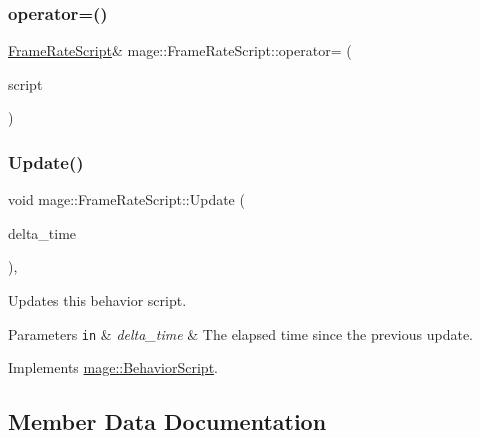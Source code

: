 \subsubsection{\texorpdfstring{operator=()}{operator=()}\hspace{0.1cm}{\footnotesize\ttfamily [2/2]}}
{\footnotesize\ttfamily \hyperlink{classmage_1_1_frame_rate_script}{Frame\+Rate\+Script}\& mage\+::\+Frame\+Rate\+Script\+::operator= (\begin{DoxyParamCaption}\item[{\hyperlink{classmage_1_1_frame_rate_script}{Frame\+Rate\+Script} \&\&}]{script }\end{DoxyParamCaption})\hspace{0.3cm}{\ttfamily [delete]}}

\hypertarget{classmage_1_1_frame_rate_script_a9bab0b26279823f1387428268b30e034}{}\label{classmage_1_1_frame_rate_script_a9bab0b26279823f1387428268b30e034} 
\subsubsection{\texorpdfstring{Update()}{Update()}}
{\footnotesize\ttfamily void mage\+::\+Frame\+Rate\+Script\+::\+Update (\begin{DoxyParamCaption}\item[{double}]{delta\+\_\+time }\end{DoxyParamCaption})\hspace{0.3cm}{\ttfamily [override]}, {\ttfamily [virtual]}}

Updates this behavior script.


\begin{DoxyParams}[1]{Parameters}
\mbox{\tt in}  & {\em delta\+\_\+time} & The elapsed time since the previous update. \\
\hline
\end{DoxyParams}


Implements \hyperlink{classmage_1_1_behavior_script_a905b6c83640cb91d19fecab3435f6feb}{mage\+::\+Behavior\+Script}.



\subsection{Member Data Documentation}
\hypertarget{classmage_1_1_frame_rate_script_a96dc980d017ad5e1b1f00db2526cd576}{}\label{classmage_1_1_frame_rate_script_a96dc980d017ad5e1b1f00db2526cd576} 
